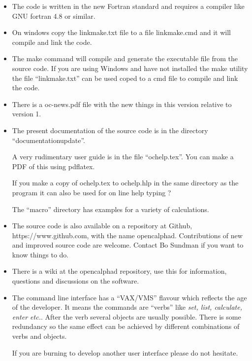 \documentclass[12pt]{article}
\begin{document}
\begin{itemize}
\item The code is written in the new Fortran standard and requires a
  compiler like GNU fortran 4.8 or similar.

\item On windows copy the linkmake.txt file to a file linkmake.cmd and
  it will compile and link the code.

\item The make command will compile and generate the executable file
  from the source code.  If you are using Windows and have not
  installed the make utility the file ``linkmake.txt'' can be used
  coped to a cmd file to compile and link the code.

\item There is a oc-news.pdf file with the new things in this version
  relative to version 1.

\item The present documentation of the source code is in the directory
  ``documentationupdate''.  

  A very rudimentary user guide is in the file ``ochelp.tex''.  You
  can make a PDF of this using pdflatex.  

  If you make a copy of ochelp.tex to ochelp.hlp in the same directory
  as the program it can also be used for on line help typing ?

  The ``macro'' directory has examples for a variety of calculations.

\item The source code is also available on a repository at Github,
  https://www.github.com, with the name opencalphad.  Contributions of
  new and improved source code are welcome.  Contact Bo Sundman if you
  want to know things to do.

\item There is a wiki at the opencalphad repository, use this for
  information, questions and discussions on the software.

\item The command line interface has a ``VAX/VMS'' flavour which
  reflects the age of the developer.  It means the commands are
  ``verbs'' like {\em set, list, calculate, enter etc.}.  After the
  verb several objects are usually possible.  There is some redundancy
  so the same effect can be achieved by different combinations of
  verbs and objects.

  If you are burning to develop another user interface please do not
  hesitate.


\end{itemize}
\end{document}

